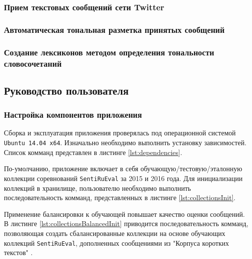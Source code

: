         \subsubsection{Прием текстовых сообщений сети Twitter}

        \subsubsection{Автоматическая тональная разметка принятых сообщений}

        \subsubsection{Создание лексиконов методом определения тональности словосочетаний}

    \subsection{Руководство пользователя}
        \subsubsection{Настройка компонентов приложения}
        Сборка и эксплуатация приложения проверялась под операционной системой
        {\tt Ubuntu 14.04 x64}. Изначально необходимо выполнить установку зависимостей.
        Список комманд представлен в листинге \ref{lst:dependencies}.
        \lstset{style=bash}
        

            По-умолчанию, приложение включает в себя обучающую/тестовую/эталонную
            коллекции соревнований {\tt SentiRuEval} за 2015 и 2016 года. Для
            инициализации коллекций в хранилище, пользователю необходимо выполнить
            последовательность комманд, представленных в листинге \ref{lst:collectionsInit}.
            \lstset{style=bash}
            

            Применение балансировки к обучающей повышает качество оценки сообщений.
            \cite{diploma2015} В листинге \ref{lst:collectionsBalancedInit} приводится
            последовательность комманд, позволяющая создать сбалансированные коллекции
            на основе обучающих коллекций {\tt SentiRuEval}, дополненных сообщениями
            из "Корпуса коротких текстов" \cite{rubtsovaCollection}.
            \lstset{style=bash}
            

